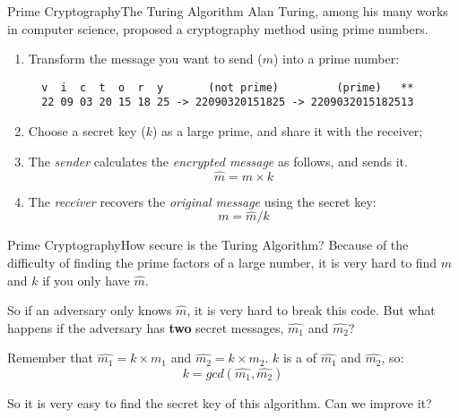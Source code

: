 
\begin{frame}[fragile]{Prime Cryptography}{The Turing Algorithm}
  Alan Turing, among his many works in computer science, proposed a cryptography method using prime numbers.\bigskip

  \begin{enumerate}
    \item Transform the message you want to send ($m$) into a prime number:
\begin{verbatim}
  v  i  c  t  o  r  y       (not prime)         (prime)   **
  22 09 03 20 15 18 25 -> 22090320151825 -> 2209032015182513
\end{verbatim}
    \item Choose a secret key ($k$) as a large prime, and share it with the receiver;
    \item The \emph{sender} calculates the \emph{encrypted message} as follows, and sends it.
    \begin{equation*}
      \hat{m} = m\times k
    \end{equation*}
    \item The \emph{receiver} recovers the \emph{original message} using the secret key:
    \begin{equation*}
      m = \hat{m}/k
    \end{equation*}
  \end{enumerate}
\end{frame}

\begin{frame}{Prime Cryptography}{How secure is the Turing Algorithm?}
  Because of the difficulty of finding the prime factors of a large number, it is very hard to find $m$ and $k$ if you only have $\hat{m}$.\bigskip

  So if an adversary only knows $\hat{m}$, it is very hard to break this code. But what happens if the adversary has {\bf two} secret messages, $\hat{m_1}$ and $\hat{m_2}$?\bigskip

  Remember that $\hat{m_1} = k\times m_1$ and $\hat{m_2} = k\times m_2$. $k$ is a  of $\hat{m_1}$ and $\hat{m_2}$, so:
  \begin{equation*}
    k = gcd(\hat{m_1}, \hat{m_2})
  \end{equation*}\bigskip

  So it is very easy to find the secret key of this algorithm. Can we improve it?
\end{frame}
